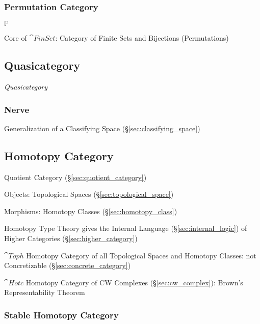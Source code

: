 \subsubsection{Permutation Category}\label{sec:permutation_category}

$\mathbb{P}$

Core of $\cat{FinSet}$: Category of Finite Sets and Bijections
(Permutations)



\subsection{Quasicategory}\label{sec:quasicategory}

\emph{Quasicategory}



\subsubsection{Nerve}\label{sec:nerve}

Generalization of a Classifying Space (\S\ref{sec:classifying_space})



\subsection{Homotopy Category}\label{sec:homotopy_category}

Quotient Category (\S\ref{sec:quotient_category})

Objects: Topological Spaces (\S\ref{sec:topological_space})

Morphisms: Homotopy Classes (\S\ref{sec:homotopy_class})

Homotopy Type Theory gives the Internal Language
(\S\ref{sec:internal_logic}) of Higher Categories
(\S\ref{sec:higher_category})

$\cat{Toph}$ Homotopy Category of all Topological Spaces and Homotopy
Classes: not Concretizable (\S\ref{sec:concrete_category})

$\cat{Hotc}$ Homotopy Category of CW Complexes
(\S\ref{sec:cw_complex}): Brown's Representability Theorem



\subsubsection{Stable Homotopy Category}\label{sec:stable_homotopy_category}

